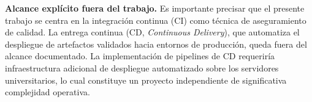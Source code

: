 \textbf{Alcance explícito fuera del trabajo.} Es importante precisar que el
presente trabajo se centra en la integración continua (CI) como técnica de
aseguramiento de calidad. La entrega continua (CD, \textit{Continuous Delivery}),
que automatiza el despliegue de artefactos validados hacia entornos de
producción, queda fuera del alcance documentado. La implementación de pipelines
de CD requeriría infraestructura adicional de despliegue automatizado sobre los
servidores universitarios, lo cual constituye un proyecto independiente de
significativa complejidad operativa.
